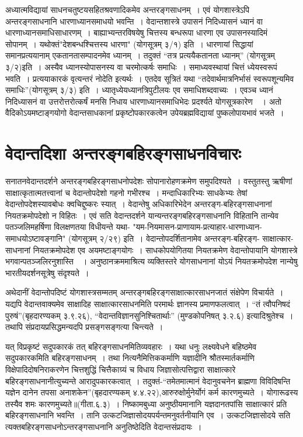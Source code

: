 {अध्यात्मविद्यायां साधनचतुष्टयसहितश्रवणादिकमेव अन्तरङ्गसाधनम्~। एवं योगशास्त्रेऽपि अन्तरङ्गसाधनानि धारणाध्यानसमाधयो भवन्ति~। वेदान्तशास्त्रे उपासनं निदिध्यासनं ध्यानं वा धारणाध्यानसमाधिसाधारणम्~। बाह्याभ्यन्तरविषयेषु चित्तस्य बन्धरूपा धारणा एव उपासनस्यादिमं सोपानम्~। यथोक्तं"देशबन्धश्चित्तस्य धारणा" (योगसूत्रम् ३/१) इति~। धारणायां सिद्धायां समानप्रत्ययानाम् एकतानतासम्पादनमेव ध्यानम्~। तदुक्तं “तत्र प्रत्ययैकतानता ध्यानम्” (योगसूत्रम् ३/२)इति~। अस्यैव ध्यानस्योपासनस्य वा चरमोत्कर्षः समाधिः~। समाध्यवस्थायां चित्तं ध्येयस्वरूपं भवति~। प्रत्ययाकारकं वृत्यन्तरं नोदेति इत्यर्थः~। एतदेव सूत्रितं यथा “तदेवार्थमात्रनिर्भासं स्वरूपशून्यमिव समाधिः”(योगसूत्रम् ३/३) इति~। ध्यातृध्येयध्यानत्रिपुटीलयः एव समाधिशब्दवाच्यः~। एवञ्च ध्यानं निदिध्यासनं वा उत्तरोत्तरोत्कर्षं मनसि निधाय धारणाध्यानसमाधिभेदः प्रदर्श्यते योगसूत्रकारेण~~। अतो वैदिकोऽयमष्टाङ्गयोगो वेदान्तसाधकानां प्रकृष्टोपकारकत्वेन उपेयब्रह्मविद्यायां पुष्कलोपायभावं भजते~। 

\section*{वेदान्तदिशा अन्तरङ्गबहिरङ्गसाधनविचारः}

सनातनवेदान्तदर्शने अन्तरङ्गबहिरङ्गसाधनोपदेशः सोपानारोहणक्रमेण समुपदिश्यते~। वस्तुतस्तु ऋषीणां साक्षात्कृतात्मतत्त्वानां च वेदान्तोपदेशो गहनो गभीरश्च~। मन्दाधिकारिभ्यः साधकेभ्यः तेषां वेदान्तोपदेशस्यावबोधः क्वचिद्दुष्करः स्यात्~। वेदान्तेषु अधिकारिभेदेन \break अन्तरङ्ग-बहिरङ्गसाधनानां नियतक्रमोपदेशो न विहितः~। एवं सति वेदान्तदर्शने यान्यन्तरङ्गबहिरङ्गसाधनानि विहितानि तान्येव पतञ्जलिमहर्षिणा विलक्षणतया विधीयन्ते यथा- "यम-नियमासन-प्राणायाम-प्रत्याहार-धारणाध्यान- समाधयोऽष्टावङ्गानि" (योगसूत्रम् २/२९) इति~। वेदान्तोपदर्शितानामेव अन्तरङ्ग-बहिरङ्ग- साक्षात्कार-साधनानां नियतक्रमोपदेश एव अयमष्टाङ्गयोगः~। साधकोपयोगितया नियतक्रमेण वेदान्तोपायानि योगशास्त्रे भगवान्पतञ्जलिरनुशास्ति~~। अनुष्ठानक्रममाश्रित्य व्यक्तिस्तरे योगसाधनानां योऽयं नियतक्रमोपदेश नान्येषु भारतीयदर्शनसूत्रेषु संदृश्यते~। 

अथेदानीं वेदान्तोपदिष्टं योगशास्त्रसम्मतम् अन्तरङ्गबहिरङ्गसाक्षात्कारसाधनजातं संक्षेपेण विचार्यते~। यद्यपि वेदान्तवाक्यमेव साक्षादिह साक्षात्कारसाधनमिति परमार्थः ज्ञानस्य प्रमाणफलत्वात्~। “तं त्वौपनिषदं पुरुषं”(बृहदारण्यकम् ३.९.२६), “वेदान्तविज्ञानसुनिश्चितार्थाः” (मुण्डकोपनिषत् ३.२.६) इत्यादिश्रुतेश्च~। तथापि संप्रदायप्रसिद्धमन्यदपि प्रसङ्गसङ्गत्या चिन्त्यते~। 

यत् विप्रकृष्टं सदुपकारकं तत् बहिरङ्गसाधनमितिव्यवहारः~। यथा धनुः लक्ष्यवेधने बहिष्ठमेव सदुपकारकमिति बहिरङ्गसाधनम्~। तथा नित्यनैमित्तिककर्माणि यज्ञादीनि श्रौतस्मार्तकर्माणि विक्षेपादिदोषनिराकरणेन चित्तशुद्धिं चित्तैकाग्र्यं च विधाय जिज्ञासोत्पत्तिद्वारा साक्षात्कारे बहिरङ्गसाधनानीत्युच्यन्ते आरादुपकारकत्वात्~। तदुक्तं-“तमेतमात्मानं वेदानुवचनेन ब्राह्मणा विविदिषन्ति यज्ञेन दानेन तपसा अनाशकेन”(बृहदारण्यकम् ४.४.२२),आरुरुक्षोर्मुनेर्योगं कर्म कारणमुच्यते~। योगारूढस्य तस्यैव शमः कारणमुच्यते॥(गीता.६.३)~। निष्कामबुध्या अनुष्ठीयमानानि यज्ञदानतपांसि साक्षात्कारं प्रति बहिरङ्गसाधनानि भवन्ति~। तानि उत्कटजिज्ञासोदयपर्यन्तमनुवर्तनीयानि एव~। उत्कटजिज्ञासोदये सति त्यक्तबहिरङ्गसाधनोऽन्तरङ्गसाधनानि अनुतिष्ठेदिति वेदान्तसंप्रदायः~। 

}
